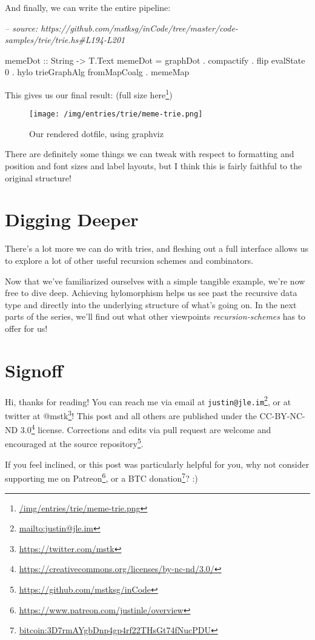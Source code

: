 \documentclass[]{article}
\newenvironment{Shaded}{}{}
\newcommand{\CommentTok}[1]{\textcolor[rgb]{0.38,0.63,0.69}{\textit{#1}}}
\newcommand{\DataTypeTok}[1]{\textcolor[rgb]{0.56,0.13,0.00}{#1}}
\newcommand{\DecValTok}[1]{\textcolor[rgb]{0.25,0.63,0.44}{#1}}
\newcommand{\FunctionTok}[1]{\textcolor[rgb]{0.02,0.16,0.49}{#1}}
\newcommand{\NormalTok}[1]{#1}
\newcommand{\OtherTok}[1]{\textcolor[rgb]{0.00,0.44,0.13}{#1}}
\renewcommand{\href}[2]{#2\footnote{\url{#1}}}
\begin{document}
And finally, we can write the entire pipeline:

\begin{Shaded}
\begin{Highlighting}[]
\CommentTok{-- source: https://github.com/mstksg/inCode/tree/master/code-samples/trie/trie.hs#L194-L201}

\NormalTok{memeDot}
\OtherTok{    ::} \DataTypeTok{String}
    \OtherTok{->} \DataTypeTok{T.Text}
\NormalTok{memeDot }\FunctionTok{=}\NormalTok{ graphDot}
        \FunctionTok{.}\NormalTok{ compactify}
        \FunctionTok{.}\NormalTok{ flip evalState }\DecValTok{0}
        \FunctionTok{.}\NormalTok{ hylo trieGraphAlg fromMapCoalg}
        \FunctionTok{.}\NormalTok{ memeMap}
\end{Highlighting}
\end{Shaded}

This gives us our final result: (\href{/img/entries/trie/meme-trie.png}{full
size here})

\begin{figure}
\centering
\texttt{[image: /img/entries/trie/meme-trie.png]}
\caption{Our rendered dotfile, using graphviz}
\end{figure}

There are definitely some things we can tweak with respect to formatting and
position and font sizes and label layouts, but I think this is fairly faithful
to the original structure!

\hypertarget{digging-deeper}{%
\section{Digging Deeper}\label{digging-deeper}}

There's a lot more we can do with tries, and fleshing out a full interface
allows us to explore a lot of other useful recursion schemes and combinators.

Now that we've familiarized ourselves with a simple tangible example, we're now
free to dive deep. Achieving hylomorphism helps us see past the recursive data
type and directly into the underlying structure of what's going on. In the next
parts of the series, we'll find out what other viewpoints
\emph{recursion-schemes} has to offer for us!

\hypertarget{signoff}{%
\section{Signoff}\label{signoff}}

Hi, thanks for reading! You can reach me via email at
\href{mailto:justin@jle.im}{\nolinkurl{justin@jle.im}}, or at twitter at
\href{https://twitter.com/mstk}{@mstk}! This post and all others are published
under the \href{https://creativecommons.org/licenses/by-nc-nd/3.0/}{CC-BY-NC-ND
3.0} license. Corrections and edits via pull request are welcome and encouraged
at \href{https://github.com/mstksg/inCode}{the source repository}.

If you feel inclined, or this post was particularly helpful for you, why not
consider \href{https://www.patreon.com/justinle/overview}{supporting me on
Patreon}, or a \href{bitcoin:3D7rmAYgbDnp4gp4rf22THsGt74fNucPDU}{BTC donation}?
:)
\end{document}
